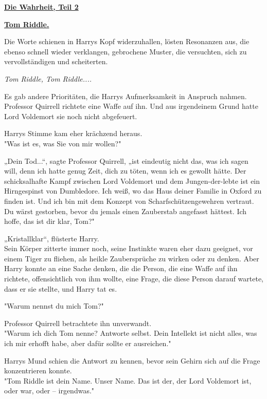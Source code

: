 

\hypertarget{die-wahrheit-teil-2}{%

\textbf{\uline{Die Wahrheit, Teil 2}}

\hfill\break

\textbf{\uline{Tom Riddle.}}

Die Worte schienen in Harrys Kopf widerzuhallen, lösten Resonanzen aus, die ebenso schnell wieder verklangen, gebrochene Muster, die versuchten, sich zu vervollständigen und scheiterten.

\emph{Tom Riddle, Tom Riddle....}

Es gab andere Prioritäten, die Harrys Aufmerksamkeit in Anspruch nahmen. Professor Quirrell richtete eine Waffe auf ihn. Und aus irgendeinem Grund hatte Lord Voldemort sie noch nicht abgefeuert.

Harrys Stimme kam eher krächzend heraus.\\ "Was ist es, was Sie von mir wollen?"

„Dein Tod...“, sagte Professor Quirrell, „ist eindeutig nicht das, was ich sagen will, denn ich hatte genug Zeit, dich zu töten, wenn ich es gewollt hätte. Der schicksalhafte Kampf zwischen Lord Voldemort und dem Jungen-der-lebte ist ein Hirngespinst von Dumbledore. Ich weiß, wo das Haus deiner Familie in Oxford zu finden ist. Und ich bin mit dem Konzept von Scharfschützengewehren vertraut. Du wärst gestorben, bevor du jemals einen Zauberstab angefasst hättest. Ich hoffe, das ist dir klar, Tom?"

„Kristallklar“, flüsterte Harry.\\ Sein Körper zitterte immer noch, seine Instinkte waren eher dazu geeignet, vor einem Tiger zu fliehen, als heikle Zaubersprüche zu wirken oder zu denken. Aber Harry konnte an eine Sache denken, die die Person, die eine Waffe auf ihn richtete, offensichtlich von ihm wollte, eine Frage, die diese Person darauf wartete, dass er sie stellte, und Harry tat es.

"Warum nennst du mich Tom?"

Professor Quirrell betrachtete ihn unverwandt.\\ "Warum ich dich Tom nenne? Antworte selbst. Dein Intellekt ist nicht alles, was ich mir erhofft habe, aber dafür sollte er ausreichen."

Harrys Mund schien die Antwort zu kennen, bevor sein Gehirn sich auf die Frage konzentrieren konnte.\\ "Tom Riddle ist dein Name. Unser Name. Das ist der, der Lord Voldemort ist, oder war, oder -- irgendwas."

}
